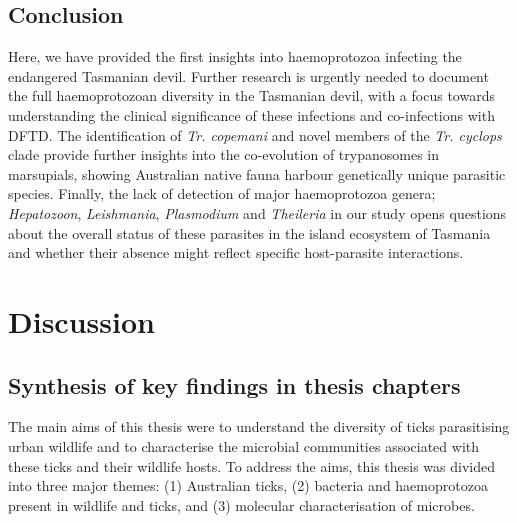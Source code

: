 \documentclass[a4paper, nobind]{templates/ociamthesis}
\begin{document}
\hypertarget{conclusion-1}{%
\section{Conclusion}\label{conclusion-1}}

Here, we have provided the first insights into haemoprotozoa infecting the endangered Tasmanian devil. Further research is urgently needed to document the full haemoprotozoan diversity in the Tasmanian devil, with a focus towards understanding the clinical significance of these infections and co-infections with DFTD. The identification of \emph{Tr. copemani} and novel members of the \emph{Tr. cyclops} clade provide further insights into the co-evolution of trypanosomes in marsupials, showing Australian native fauna harbour genetically unique parasitic species. Finally, the lack of detection of major haemoprotozoa genera; \emph{Hepatozoon}, \emph{Leishmania}, \emph{Plasmodium} and \emph{Theileria} in our study opens questions about the overall status of these parasites in the island ecosystem of Tasmania and whether their absence might reflect specific host-parasite interactions.

\hypertarget{gendiscussion}{%
\chapter{Discussion}\label{gendiscussion}}

\hypertarget{synthesis-of-key-findings-in-thesis-chapters}{%
\section{Synthesis of key findings in thesis chapters}\label{synthesis-of-key-findings-in-thesis-chapters}}

The main aims of this thesis were to understand the diversity of ticks parasitising urban wildlife and to characterise the microbial communities associated with these ticks and their wildlife hosts.
To address the aims, this thesis was divided into three major themes: (1) Australian ticks, (2) bacteria and haemoprotozoa present in wildlife and ticks, and (3) molecular characterisation of microbes.
\end{document}
